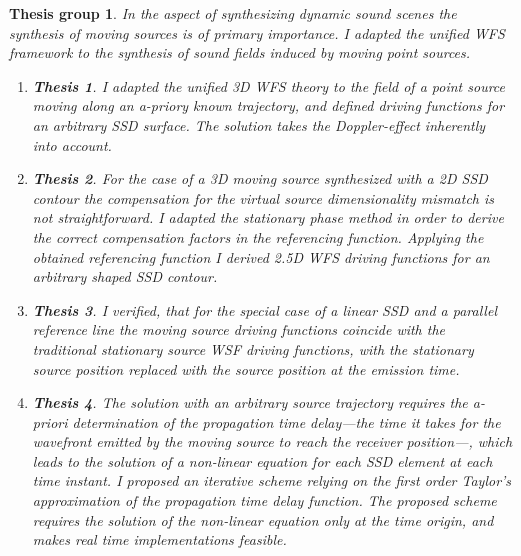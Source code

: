 \documentclass[10pt,twoside]{article}
\theoremstyle{thesisgroupstyle}
\newtheorem{thesisgroup}{Thesis group}
\newtheorem{thesis}{Thesis}[thesisgroup]
\begin{document}
\begin{thesisgroup}
In the aspect of synthesizing dynamic sound scenes the synthesis of moving sources is of primary importance.
I adapted the unified WFS framework to the synthesis of sound fields induced by moving point sources.
\begin{enumerate}
\item[] \vspace{-7mm}\begin{thesis}I adapted the unified 3D WFS theory to the field of a point source moving along an a-priory known trajectory, and defined driving functions for an arbitrary SSD surface.
The solution takes the Doppler-effect inherently into account.\end{thesis}
\item[] \vspace{-7mm}\begin{thesis}For the case of a 3D moving source synthesized with a 2D SSD contour the compensation for the virtual source dimensionality mismatch is not straightforward.
I adapted the stationary phase method in order to derive the correct compensation factors in the referencing function. 
Applying the obtained referencing function I derived 2.5D WFS driving functions for an arbitrary shaped SSD contour.\end{thesis}
\item[] \vspace{-7mm}\begin{thesis}I verified, that for the special case of a linear SSD and a parallel reference line the moving source driving functions coincide with the traditional stationary source WSF driving functions, with the stationary source position replaced with the source position at the emission time.\end{thesis}
\item[] \vspace{-7mm}\begin{thesis}The solution with an arbitrary source trajectory requires the a-priori determination of the propagation time delay---the time it takes for the wavefront emitted by the moving source to reach the receiver position---, which leads to the solution of a non-linear equation for each SSD element at each time instant.
I proposed an iterative scheme relying on the first order Taylor's approximation of the propagation time delay function.
The proposed scheme requires the solution of the non-linear equation only at the time origin, and makes real time implementations feasible.\end{thesis}

\end{enumerate}
\end{thesisgroup}
\end{document}
